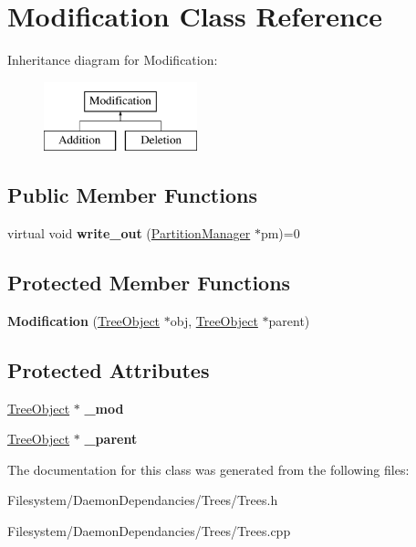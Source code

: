 \hypertarget{classModification}{}\section{Modification Class Reference}
\label{classModification}
Inheritance diagram for Modification\+:\begin{figure}[H]
\begin{center}
\leavevmode
\includegraphics[height=2.000000cm]{classModification}
\end{center}
\end{figure}
\subsection*{Public Member Functions}
\begin{DoxyCompactItemize}
\item 
\mbox{\label{classModification_a50d1fd809524902d2a1e78d02f4be1dc}} 
virtual void {\bfseries write\+\_\+out} (\mbox{\hyperlink{classPartitionManager}{Partition\+Manager}} $\ast$pm)=0
\end{DoxyCompactItemize}
\subsection*{Protected Member Functions}
\begin{DoxyCompactItemize}
\item 
\mbox{\label{classModification_a76407b8c6d2adb840dceea708355aba8}} 
{\bfseries Modification} (\mbox{\hyperlink{classTreeObject}{Tree\+Object}} $\ast$obj, \mbox{\hyperlink{classTreeObject}{Tree\+Object}} $\ast$parent)
\end{DoxyCompactItemize}
\subsection*{Protected Attributes}
\begin{DoxyCompactItemize}
\item 
\mbox{\label{classModification_a0aa2f9924cde904b1683f3bd80d87a02}} 
\mbox{\hyperlink{classTreeObject}{Tree\+Object}} $\ast$ {\bfseries \+\_\+mod}
\item 
\mbox{\label{classModification_a529d02be9866b96746bcae63a763f868}} 
\mbox{\hyperlink{classTreeObject}{Tree\+Object}} $\ast$ {\bfseries \+\_\+parent}
\end{DoxyCompactItemize}


The documentation for this class was generated from the following files\+:\begin{DoxyCompactItemize}
\item 
Filesystem/\+Daemon\+Dependancies/\+Trees/Trees.\+h\item 
Filesystem/\+Daemon\+Dependancies/\+Trees/Trees.\+cpp\end{DoxyCompactItemize}
